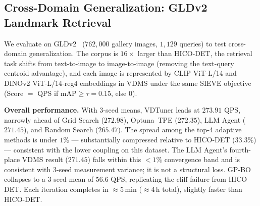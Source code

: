 \documentclass[sigconf, nonacm]{acmart}
\theoremstyle{definition}
\begin{document}
\subsection{Cross-Domain Generalization: GLDv2 Landmark Retrieval}
\label{sec:gldv2}

We evaluate on GLDv2~\cite{weyand2020gld} ($762{,}000$ gallery images, $1{,}129$ queries) to test cross-domain generalization.
The corpus is $16\times$ larger than HICO-DET, the retrieval task shifts from text-to-image to image-to-image (removing the text-query centroid advantage), and each image is represented by CLIP ViT-L/14 and DINOv2 ViT-L/14-reg4 embeddings in VDMS under the same SIEVE objective (Score $=$ QPS if mAP$\geq\tau{=}0.15$, else $0$).

\begin{table}[t]
\centering
\caption{Optimizer comparison on GLDv2 (762K gallery, 1{,}129 queries, 50 iterations, 3-seed means; Grid: 1~run).}
\label{tab:gldv2}
\end{table}

\noindent\textbf{Overall performance.}
With 3-seed means, VDTuner leads at $\mathbf{273.91}$ QPS, narrowly ahead of
Grid Search ($272.98$), Optuna~TPE ($272.35$), LLM Agent ($271.45$), and Random Search ($265.47$).
The spread among the top-4 adaptive methods is under $1\%$ --- substantially compressed
relative to HICO-DET ($33.3\%$) --- consistent with the lower coupling on this dataset.
The LLM Agent's fourth-place VDMS result ($271.45$) falls within this $<1\%$ convergence
band and is consistent with 3-seed measurement variance; it is not a structural loss.
GP-BO collapses to a 3-seed mean of $56.6$ QPS, replicating the cliff failure from HICO-DET.
Each iteration completes in $\approx$5\,min ($\approx$4\,h total), slightly faster than HICO-DET.
\end{document}
